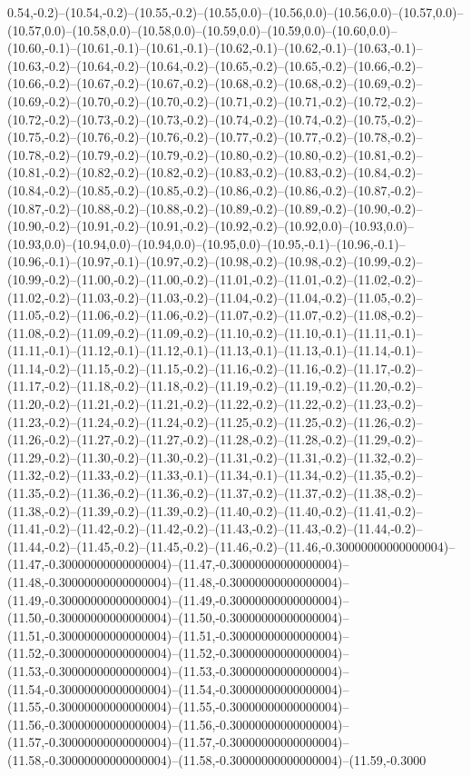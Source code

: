 0.54,-0.2)--(10.54,-0.2)--(10.55,-0.2)--(10.55,0.0)--(10.56,0.0)--(10.56,0.0)--(10.57,0.0)--(10.57,0.0)--(10.58,0.0)--(10.58,0.0)--(10.59,0.0)--(10.59,0.0)--(10.60,0.0)--(10.60,-0.1)--(10.61,-0.1)--(10.61,-0.1)--(10.62,-0.1)--(10.62,-0.1)--(10.63,-0.1)--(10.63,-0.2)--(10.64,-0.2)--(10.64,-0.2)--(10.65,-0.2)--(10.65,-0.2)--(10.66,-0.2)--(10.66,-0.2)--(10.67,-0.2)--(10.67,-0.2)--(10.68,-0.2)--(10.68,-0.2)--(10.69,-0.2)--(10.69,-0.2)--(10.70,-0.2)--(10.70,-0.2)--(10.71,-0.2)--(10.71,-0.2)--(10.72,-0.2)--(10.72,-0.2)--(10.73,-0.2)--(10.73,-0.2)--(10.74,-0.2)--(10.74,-0.2)--(10.75,-0.2)--(10.75,-0.2)--(10.76,-0.2)--(10.76,-0.2)--(10.77,-0.2)--(10.77,-0.2)--(10.78,-0.2)--(10.78,-0.2)--(10.79,-0.2)--(10.79,-0.2)--(10.80,-0.2)--(10.80,-0.2)--(10.81,-0.2)--(10.81,-0.2)--(10.82,-0.2)--(10.82,-0.2)--(10.83,-0.2)--(10.83,-0.2)--(10.84,-0.2)--(10.84,-0.2)--(10.85,-0.2)--(10.85,-0.2)--(10.86,-0.2)--(10.86,-0.2)--(10.87,-0.2)--(10.87,-0.2)--(10.88,-0.2)--(10.88,-0.2)--(10.89,-0.2)--(10.89,-0.2)--(10.90,-0.2)--(10.90,-0.2)--(10.91,-0.2)--(10.91,-0.2)--(10.92,-0.2)--(10.92,0.0)--(10.93,0.0)--(10.93,0.0)--(10.94,0.0)--(10.94,0.0)--(10.95,0.0)--(10.95,-0.1)--(10.96,-0.1)--(10.96,-0.1)--(10.97,-0.1)--(10.97,-0.2)--(10.98,-0.2)--(10.98,-0.2)--(10.99,-0.2)--(10.99,-0.2)--(11.00,-0.2)--(11.00,-0.2)--(11.01,-0.2)--(11.01,-0.2)--(11.02,-0.2)--(11.02,-0.2)--(11.03,-0.2)--(11.03,-0.2)--(11.04,-0.2)--(11.04,-0.2)--(11.05,-0.2)--(11.05,-0.2)--(11.06,-0.2)--(11.06,-0.2)--(11.07,-0.2)--(11.07,-0.2)--(11.08,-0.2)--(11.08,-0.2)--(11.09,-0.2)--(11.09,-0.2)--(11.10,-0.2)--(11.10,-0.1)--(11.11,-0.1)--(11.11,-0.1)--(11.12,-0.1)--(11.12,-0.1)--(11.13,-0.1)--(11.13,-0.1)--(11.14,-0.1)--(11.14,-0.2)--(11.15,-0.2)--(11.15,-0.2)--(11.16,-0.2)--(11.16,-0.2)--(11.17,-0.2)--(11.17,-0.2)--(11.18,-0.2)--(11.18,-0.2)--(11.19,-0.2)--(11.19,-0.2)--(11.20,-0.2)--(11.20,-0.2)--(11.21,-0.2)--(11.21,-0.2)--(11.22,-0.2)--(11.22,-0.2)--(11.23,-0.2)--(11.23,-0.2)--(11.24,-0.2)--(11.24,-0.2)--(11.25,-0.2)--(11.25,-0.2)--(11.26,-0.2)--(11.26,-0.2)--(11.27,-0.2)--(11.27,-0.2)--(11.28,-0.2)--(11.28,-0.2)--(11.29,-0.2)--(11.29,-0.2)--(11.30,-0.2)--(11.30,-0.2)--(11.31,-0.2)--(11.31,-0.2)--(11.32,-0.2)--(11.32,-0.2)--(11.33,-0.2)--(11.33,-0.1)--(11.34,-0.1)--(11.34,-0.2)--(11.35,-0.2)--(11.35,-0.2)--(11.36,-0.2)--(11.36,-0.2)--(11.37,-0.2)--(11.37,-0.2)--(11.38,-0.2)--(11.38,-0.2)--(11.39,-0.2)--(11.39,-0.2)--(11.40,-0.2)--(11.40,-0.2)--(11.41,-0.2)--(11.41,-0.2)--(11.42,-0.2)--(11.42,-0.2)--(11.43,-0.2)--(11.43,-0.2)--(11.44,-0.2)--(11.44,-0.2)--(11.45,-0.2)--(11.45,-0.2)--(11.46,-0.2)--(11.46,-0.30000000000000004)--(11.47,-0.30000000000000004)--(11.47,-0.30000000000000004)--(11.48,-0.30000000000000004)--(11.48,-0.30000000000000004)--(11.49,-0.30000000000000004)--(11.49,-0.30000000000000004)--(11.50,-0.30000000000000004)--(11.50,-0.30000000000000004)--(11.51,-0.30000000000000004)--(11.51,-0.30000000000000004)--(11.52,-0.30000000000000004)--(11.52,-0.30000000000000004)--(11.53,-0.30000000000000004)--(11.53,-0.30000000000000004)--(11.54,-0.30000000000000004)--(11.54,-0.30000000000000004)--(11.55,-0.30000000000000004)--(11.55,-0.30000000000000004)--(11.56,-0.30000000000000004)--(11.56,-0.30000000000000004)--(11.57,-0.30000000000000004)--(11.57,-0.30000000000000004)--(11.58,-0.30000000000000004)--(11.58,-0.30000000000000004)--(11.59,-0.3000